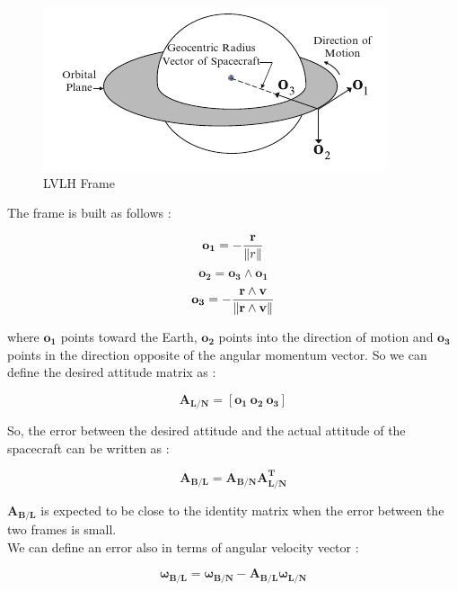 \documentclass[11pt,a4paper]{report}
\begin{document}
\begin{figure}[H]
 	\centering
 	\includegraphics[scale=0.6]{gfx/lvlh.png}
    \caption{LVLH Frame}
    \label{fig:lvlh}
\end{figure}

The frame is built as follows : 

\begin{equation*}
 \mathbf{o_1} = - \frac{\mathbf{r}}{\left\lVert r\right\rVert} 
\end{equation*}
\begin{equation*}
 \mathbf{o_2} = \mathbf{o_3} \wedge \mathbf{o_1}
\end{equation*}
\begin{equation*}
 \mathbf{o_3} = - \frac{\mathbf{r} \wedge \mathbf{v}}{\left\lVert\mathbf{r} \wedge \mathbf{v}\right\rVert}
\end{equation*}

where $\mathbf{o_1}$ points toward the Earth, $\mathbf{o_2}$ points into the direction of motion and $\mathbf{o_3}$ points in the direction opposite of the angular momentum vector.
So we can define the desired attitude matrix as : 

\begin{equation}
 \mathbf{A_{L/N}} =  [\mathbf{o_1} \ \mathbf{o_2} \ \mathbf{o_3}]
\end{equation}

So, the error between the desired attitude and the actual attitude of the spacecraft can be written as : 

\begin{equation}
 \mathbf{A_{B/L}} =  \mathbf{A_{B/N}} \mathbf{A_{L/N}^T}
\end{equation}

$\mathbf{A_{B/L}}$ is expected to be close to the identity matrix when the error between the two frames is small.\\
We can define an error also in terms of angular velocity vector : 

\begin{equation}
 \mathbf{\omega_{B/L}} = \mathbf{\omega_{B/N}} - \mathbf{A_{B/L}}\mathbf{\omega_{L/N}}
\end{equation}
\end{document}
